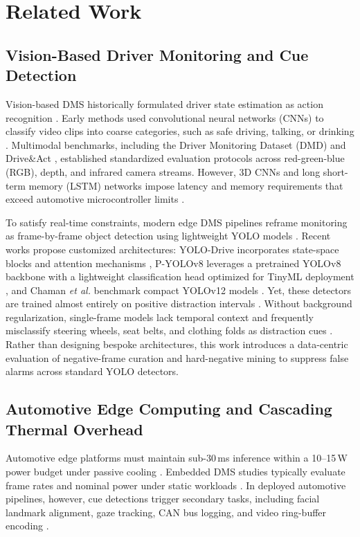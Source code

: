 \documentclass[conference]{IEEEtran}
\begin{document}
\section{Related Work}

\subsection{Vision-Based Driver Monitoring and Cue Detection}
Vision-based DMS historically formulated driver state estimation as action recognition \cite{ortega2020dmd, canas2021detection}. Early methods used convolutional neural networks (CNNs) to classify video clips into coarse categories, such as safe driving, talking, or drinking \cite{ortega2020dmd, canas2021detection}. Multimodal benchmarks, including the Driver Monitoring Dataset (DMD) \cite{ortega2020dmd} and Drive\&Act \cite{martin2019drive}, established standardized evaluation protocols across red-green-blue (RGB), depth, and infrared camera streams. However, 3D CNNs and long short-term memory (LSTM) networks impose latency and memory requirements that exceed automotive microcontroller limits \cite{canas2021detection, florez2024real}.

To satisfy real-time constraints, modern edge DMS pipelines reframe monitoring as frame-by-frame object detection using lightweight YOLO models \cite{yolodrive2025, pyolov82024}. Recent works propose customized architectures: YOLO-Drive incorporates state-space blocks and attention mechanisms \cite{yolodrive2025}, P-YOLOv8 leverages a pretrained YOLOv8 backbone with a lightweight classification head optimized for TinyML deployment \cite{pyolov82024}, and Chaman \textit{et al.} benchmark compact YOLOv12 models \cite{yolov12dms2025}. Yet, these detectors are trained almost entirely on positive distraction intervals \cite{yolodrive2025, pyolov82024}. Without background regularization, single-frame models lack temporal context and frequently misclassify steering wheels, seat belts, and clothing folds as distraction cues \cite{canas2021detection}. Rather than designing bespoke architectures, this work introduces a data-centric evaluation of negative-frame curation and hard-negative mining to suppress false alarms across standard YOLO detectors.

\subsection{Automotive Edge Computing and Cascading Thermal Overhead}
Automotive edge platforms must maintain sub-30\,ms inference within a 10--15\,W power budget under passive cooling \cite{florez2024real, liu2019edge}. Embedded DMS studies typically evaluate frame rates and nominal power under static workloads \cite{florez2024real}. In deployed automotive pipelines, however, cue detections trigger secondary tasks, including facial landmark alignment, gaze tracking, CAN bus logging, and video ring-buffer encoding \cite{florez2024real, liu2019edge}.
\end{document}
